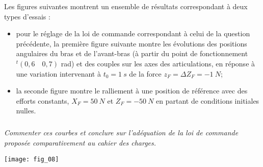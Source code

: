 \begin{multicols}{2}
Les figures suivantes montrent un ensemble de résultats correspondant à deux types d’essais :
\begin{itemize}
\item pour le réglage de la loi de commande correspondant à celui de la question précédente, la première figure suivante montre les évolutions des positions angulaires du bras et de l’avant-bras (à partir du point de fonctionnement $ ^t(0,6 \quad 0,7)$ rad)
et des couples sur les axes des articulations, en réponse à une variation intervenant à $t_0 = \SI{1}{s}$ de la force $z_F = \Delta Z_F = -\SI{1}{N}$;
\item la seconde figure montre le ralliement à une position de référence avec des efforts constants, $X_F = \SI{50}{N}$ et $Z_F = -\SI{50}{N}$ en partant de conditions initiales nulles.
\end{itemize}
\subparagraph{}\textit{
Commenter ces courbes et conclure sur l’adéquation de la loi de commande proposée comparativement au cahier
des charges.}
\ifprof
\begin{corrige}
\end{corrige}
\else
\fi



\end{multicols}

\begin{center}
\texttt{[image: fig\_08]}
\end{center}
